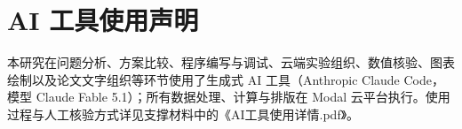 \section*{AI 工具使用声明}
本研究在问题分析、方案比较、程序编写与调试、云端实验组织、数值核验、图表绘制以及论文文字组织等环节使用了生成式 AI 工具（Anthropic Claude Code，模型 Claude Fable 5.1）；所有数据处理、计算与排版在 Modal 云平台执行。使用过程与人工核验方式详见支撑材料中的《AI工具使用详情.pdf》。
